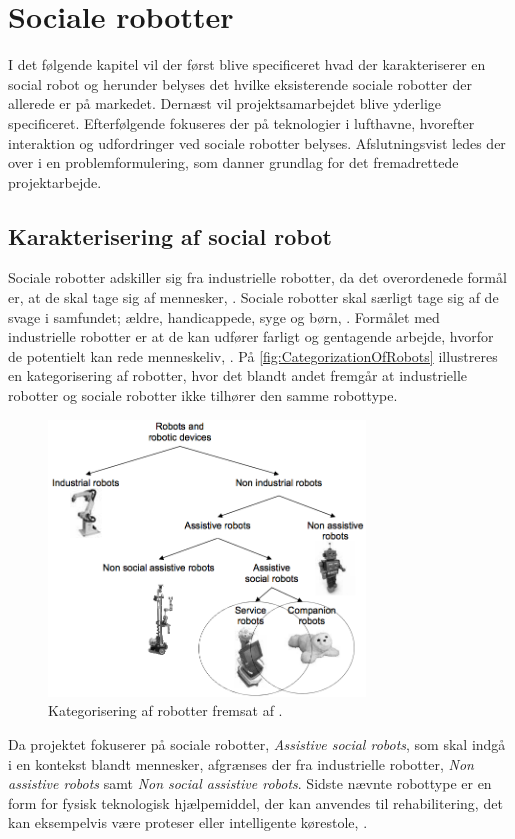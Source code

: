 \chapter{Sociale robotter}
\label{SocialRobot}
%
I det følgende kapitel vil der først blive specificeret hvad der karakteriserer en social robot og herunder belyses det hvilke eksisterende sociale robotter der allerede er på markedet. Dernæst vil projektsamarbejdet blive yderlige specificeret. Efterfølgende fokuseres der på teknologier i lufthavne, hvorefter interaktion og udfordringer ved sociale robotter belyses. Afslutningsvist ledes der over i en problemformulering, som danner grundlag for det fremadrettede projektarbejde.
%
\section{Karakterisering af social robot}
\label{KarakteriseringAfSocialRobot}
%
Sociale robotter adskiller sig fra industrielle robotter, da det overordenede formål er, at de skal tage sig af mennesker, \parencite[s. 13]{PDF:RobotShiftFromIPtoSR}. Sociale robotter skal særligt tage sig af de svage i samfundet; ældre, handicappede, syge og børn, \parencite[s. 14]{PDF:RobotShiftFromIPtoSR}. Formålet med industrielle robotter er at de kan udfører farligt og gentagende arbejde, hvorfor de potentielt kan rede menneskeliv, \parencite[ss. 12-13]{PDF:RobotShiftFromIPtoSR}. På \autoref{fig:CategorizationOfRobots} illustreres en kategorisering af robotter, hvor det blandt andet fremgår at industrielle robotter og sociale robotter ikke tilhører den samme robottype.    
%
\begin{figure}[H]
\centering
\includegraphics[width = 0.75\textwidth]{Figure/CategorizationOfRobots} 
\caption{Kategorisering af robotter fremsat af \textcite[s. 13]{PDF:AssesingAcceptance}.}
\label{fig:CategorizationOfRobots}
\end{figure}
\noindent 
%
Da projektet fokuserer på sociale robotter, \textit{Assistive social robots}, som skal indgå i en kontekst blandt mennesker, afgrænses der fra industrielle robotter, \textit{Non assistive robots} samt \textit{Non social assistive robots}. Sidste nævnte robottype er en form for fysisk teknologisk hjælpemiddel, der kan anvendes til rehabilitering, det kan eksempelvis være proteser eller intelligente kørestole, \parencite[s. 12]{PDF:AssesingAcceptance}.    

